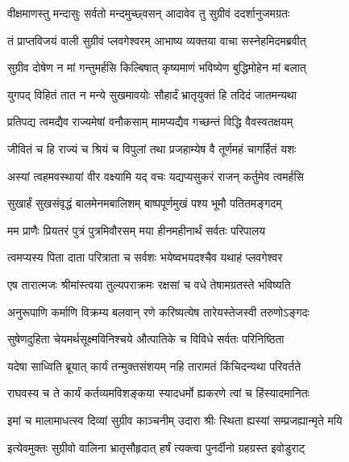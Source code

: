 
\twolineshloka
{वीक्षमाणस्तु मन्दासुः सर्वतो मन्दमुच्छ्वसन्}
{आदावेव तु सुग्रीवं ददर्शानुजमग्रतः} %

\twolineshloka
{तं प्राप्तविजयं वाली सुग्रीवं प्लवगेश्वरम्}
{आभाष्य व्यक्तया वाचा सस्नेहमिदमब्रवीत्} %

\twolineshloka
{सुग्रीव दोषेण न मां गन्तुमर्हसि किल्बिषात्}
{कृष्यमाणं भविष्येण बुद्धिमोहेन मां बलात्} %

\twolineshloka
{युगपद् विहितं तात न मन्ये सुखमावयोः}
{सौहार्दं भ्रातृयुक्तं हि तदिदं जातमन्यथा} %

\twolineshloka
{प्रतिपद्य त्वमद्यैव राज्यमेषां वनौकसाम्}
{मामप्यद्यैव गच्छन्तं विद्धि वैवस्वतक्षयम्} %

\twolineshloka
{जीवितं च हि राज्यं च श्रियं च विपुलां तथा}
{प्रजहाम्येष वै तूर्णमहं चागर्हितं यशः} %

\twolineshloka
{अस्यां त्वहमवस्थायां वीर वक्ष्यामि यद् वचः}
{यद्यप्यसुकरं राजन् कर्तुमेव त्वमर्हसि} %

\twolineshloka
{सुखार्हं सुखसंवृद्धं बालमेनमबालिशम्}
{बाष्पपूर्णमुखं पश्य भूमौ पतितमङ्गदम्} %

\twolineshloka
{मम प्राणैः प्रियतरं पुत्रं पुत्रमिवौरसम्}
{मया हीनमहीनार्थं सर्वतः परिपालय} %

\twolineshloka
{त्वमप्यस्य पिता दाता परित्राता च सर्वशः}
{भयेष्वभयदश्चैव यथाहं प्लवगेश्वर} %

\twolineshloka
{एष तारात्मजः श्रीमांस्त्वया तुल्यपराक्रमः}
{रक्षसां च वधे तेषामग्रतस्ते भविष्यति} %

\twolineshloka
{अनुरूपाणि कर्माणि विक्रम्य बलवान् रणे}
{करिष्यत्येष तारेयस्तेजस्वी तरुणोऽङ्गदः} %

\twolineshloka
{सुषेणदुहिता चेयमर्थसूक्ष्मविनिश्चये}
{औत्पातिके च विविधे सर्वतः परिनिष्ठिता} %

\twolineshloka
{यदेषा साध्विति ब्रूयात् कार्यं तन्मुक्तसंशयम्}
{नहि तारामतं किंचिदन्यथा परिवर्तते} %

\twolineshloka
{राघवस्य च ते कार्यं कर्तव्यमविशङ्कया}
{स्यादधर्मो ह्यकरणे त्वां च हिंस्यादमानितः} %

\twolineshloka
{इमां च मालामाधत्स्व दिव्यां सुग्रीव काञ्चनीम्}
{उदारा श्रीः स्थिता ह्यस्यां सम्प्रजह्यान्मृते मयि} %

\twolineshloka
{इत्येवमुक्तः सुग्रीवो वालिना भ्रातृसौहृदात्}
{हर्षं त्यक्त्वा पुनर्दीनो ग्रहग्रस्त इवोडुराट्} %

